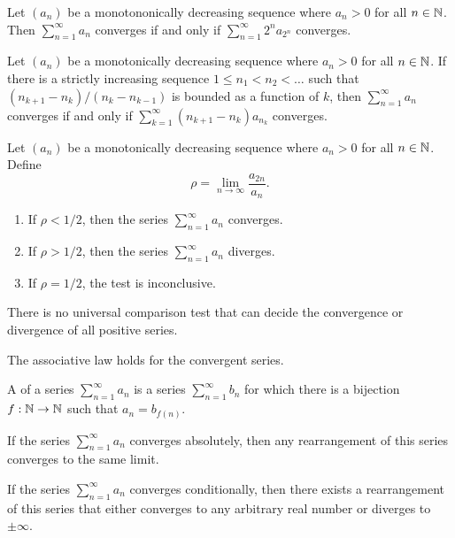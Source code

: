 \begin{proposition}
  Let $(a_n)$ be a monotononically decreasing sequence where $a_n
  > 0$ for all $n \in \mathbb N$. Then $\sum_{n = 1}^{\infty} a_n$
  converges if and only if $\sum_{n = 1}^{\infty} 2^n a_{2^n}$ converges.
\end{proposition}

\begin{proposition}
  Let $(a_n)$ be a monotonically decreasing sequence where $a_n >
  0$ for all $n \in \mathbb N$. If there is a strictly increasing sequence
  $1 \leq n_1 < n_2 < \dots$ such that $(n_{k + 1} - n_k) / (n_{k} -
  n_{k - 1})$ is bounded as a function of $k$, then $\sum_{n =
  1}^{\infty} a_n$ converges if and only if $\sum_{k = 1}^{\infty}
  (n_{k + 1} - n_k) a_{n_k}$ converges.
\end{proposition}

\begin{proposition}
  Let $(a_n)$ be a monotonically decreasing sequence where $a_n > 0$
  for all $n \in \mathbb N$. Define
  \[ \rho = \lim_{n \to \infty} \frac{a_{2n}}{a_n}. \]
  \begin{enumerate}
    \item If $\rho < 1/2$, then the series $\sum_{n = 1}^{\infty}
      a_n$ converges.
    \item If $\rho > 1/2$, then the series $\sum_{n = 1}^{\infty} a_n$ diverges.
    \item If $\rho = 1/2$, the test is inconclusive.
  \end{enumerate}
\end{proposition}

\begin{theorem}
  There is no universal comparison test that can decide the
  convergence or divergence of all positive series.
\end{theorem}

\begin{theorem}
  The associative law holds for the convergent series.
\end{theorem}

\begin{definition}
  A  of a series $\sum_{n = 1}^{\infty} a_n$ is
  a series $\sum_{n = 1}^{\infty} b_n$ for which there is a bijection
  $f : \mathbb N \to \mathbb N$ such that $a_n = b_{f(n)}$.
\end{definition}

\begin{theorem}
  If the series $\sum_{n = 1}^{\infty} a_n$ converges absolutely,
  then any rearrangement of this series converges to the same limit.
\end{theorem}

\begin{theorem}
  If the series $\sum_{n = 1}^{\infty} a_n$ converges conditionally,
  then there exists a rearrangement of this series that either
  converges to any arbitrary real number or diverges to $\pm \infty$.
\end{theorem}
